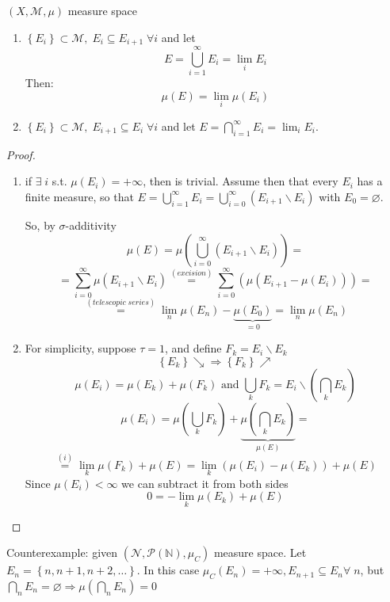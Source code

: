 \documentclass[a4paper,12pt]{article}
\theoremstyle{break}
\let\emptyset\varnothing
\numberwithin{equation}{section}
\begin{document}
\((X, \mathcal{M}, \mu)\) measure space
\begin{enumerate}
    \item \(\left\lbrace E_i \right\rbrace \subset \mathcal{M}, \; E_i \subseteq E_{i+1} \; \forall i\) and let \[
        E = \bigcup_{i = 1}^{\infty} E_i = \lim_i E_i
    \]
    Then:
    \[
        \mu(E) = \lim_i \mu(E_i)
    \]
    \item \(\left\lbrace E_i \right\rbrace \subset \mathcal{M}, \; E_{i+1} \subseteq E_{i} \; \forall i\) and let \(E = \bigcap_{i = 1}^{\infty} E_i = \lim_i E_i\).
\end{enumerate}
\begin{proof}
    \begin{enumerate}
        \item if \(\exists \; i\) s.t. \(\mu(E_i) = +\infty\), then is trivial. Assume then that every \(E_i\) has a finite measure, so that \(E = \bigcup_{i=1}^{\infty} E_i = \bigcup_{i=0}^{\infty}(E_{i+1}\backslash E_i)\) with \(E_0 = \emptyset\).
        
        So, by \(\sigma\)-additivity \[\mu(E) = \mu\left(\bigcup_{i=0}^{\infty}(E_{i+1}\backslash E_i)\right) = \]
        \[
            = \sum_{i = 0}^{\infty} \mu(E_{i + 1} \backslash E_i) \overset{(excision)}{=} \sum_{i=0}^{\infty}\left(\mu(E_{i+1} - \mu(E_i))\right) = 
        \]
        \[
            \overset{(telescopic \; series)}{=} \lim_n \mu(E_n) - \underbrace{\mu(E_0)}_{= 0} = \lim_n \mu(E_n)
        \]
        \item For simplicity, suppose \(\tau = 1\), and define \(F_k = E_i\backslash E_k\) 
        \[
            \left\lbrace E_k \right\rbrace \searrow \Longrightarrow \left\lbrace F_k \right\rbrace \nearrow
        \]
        \[
            \mu(E_i) = \mu(E_k) + \mu(F_k) \mbox{ and } \bigcup_k F_k = E_i \backslash (\bigcap_k E_k)
        \]
        \[
            \mu(E_i) = \mu(\bigcup_k F_k) + \underbrace{\mu(\bigcap_k E_k)}_{\mu(E)} =
        \]
        \[
            \overset{(i)}{=} \lim_k \mu(F_k) + \mu(E) = \lim_k \left(\mu(E_i) - \mu(E_k)\right) + \mu(E)
        \]
        Since \(\mu(E_i) < \infty\) we can subtract it from both sides
        \[
            0 = -\lim_k \mu(E_k) + \mu(E)
        \]
    \end{enumerate}
\end{proof}
Counterexample: given \((\mathcal{N}, \mathcal{P}(\mathbb{N}), \mu_C)\) measure space. Let \(E_n = \left\lbrace n, n+1, n+2, \ldots\right\rbrace\). In this case \(\mu_C (E_n) = +\infty, E_{n+1} \subseteq E_n \forall \; n\), but \(\bigcap_n E_n = \emptyset \Longrightarrow \mu\left(\bigcap_n E_n\right) = 0 \)
\end{document}

